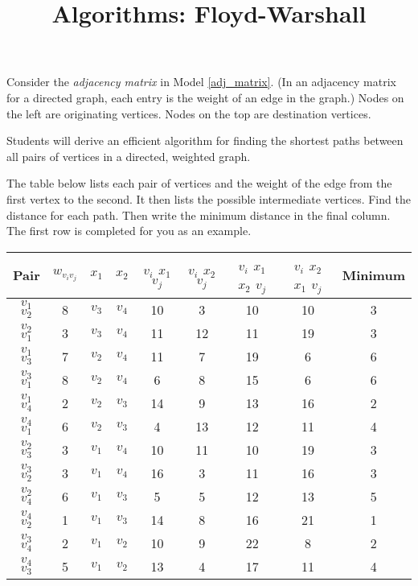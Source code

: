 \documentclass{tufte-handout}
\title{Algorithms: Floyd-Warshall}
\date{}
\begin{document}
\maketitle

\begin{questions}

\item Consider the \emph{adjacency matrix} in Model \ref{adj_matrix}. (In an adjacency matrix for a directed graph, each entry is the weight of an edge in the graph.) Nodes on the left are originating vertices. Nodes on the top are destination vertices.

\begin{objective}
  Students will derive an efficient algorithm for finding the shortest paths between all pairs of vertices in a directed, weighted graph.
\end{objective}

The table below lists each pair of vertices and the weight of the edge from the first vertex to the second. It then lists the possible intermediate vertices. Find the distance for each path. Then write the minimum distance in the final column. The first row is completed for you as an example.\label{by_hand}
\\
{\color{red} 
\begin{tabular}{|c|c|c|c|c|c|c|c|c|}
\hline
Pair & $w_{v_i v_j}$ & $x_1$ & $x_2$ & $v_i$ $x_1$ $v_j$ & $v_i$ $x_2$ $v_j$ &$v_i$ $x_1$ $x_2$ $v_j$ &$v_i$ $x_2$ $x_1$ $v_j$ & Minimum\\
\hline
$v_1$ $v_2$ & 8 & $v_3$ & $v_4$ & 10 & 3 & 10 & 10 & 3 \\
$v_2$ $v_1$ & 3 & $v_3$ & $v_4$ & 11 & 12 & 11 & 19 & 3 \\
$v_1$ $v_3$ & 7 & $v_2$ & $v_4$ & 11 & 7 & 19 & 6 & 6 \\ 
$v_3$ $v_1$ & 8 & $v_2$ & $v_4$ & 6 & 8 & 15 & 6 & 6 \\ 
$v_1$ $v_4$ & 2 & $v_2$ & $v_3$ & 14 & 9 & 13 & 16 & 2\\ 
$v_4$ $v_1$ & 6 & $v_2$ & $v_3$ & 4 & 13 & 12 & 11 & 4\\ 
$v_2$ $v_3$ & 3 & $v_1$ & $v_4$ & 10 & 11 & 10 & 19 & 3\\ 
$v_3$ $v_2$ & 3 & $v_1$ & $v_4$ & 16 & 3 & 11 & 16 & 3\\ 
$v_2$ $v_4$ & 6 & $v_1$ & $v_3$ & 5 & 5 & 12 & 13 & 5 \\ 
$v_4$ $v_2$ & 1 & $v_1$ & $v_3$ & 14 & 8 & 16 & 21 & 1\\
$v_3$ $v_4$ & 2 & $v_1$ & $v_2$ & 10 & 9 & 22 & 8 & 2\\
$v_4$ $v_3$ & 5 & $v_1$ & $v_2$ & 13 & 4 & 17 & 11 & 4\\
\hline
\end{tabular}
}


\end{questions}
\end{document}
